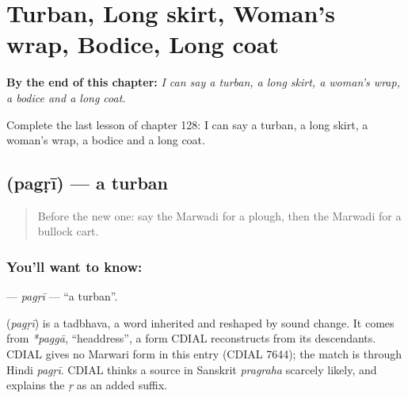 
\chapter{Turban, Long skirt, Woman's wrap, Bodice, Long coat}
\label{ch:mw-turban-long-skirt-woman-s-wrap-bodice-long-coat}

\begin{chapteropening}
\textbf{By the end of this chapter:} \emph{I can say a turban, a long skirt, a woman's wrap, a bodice and a long coat.}

Complete the last lesson of chapter 128: I can say a turban, a long skirt, a woman's wrap, a bodice and a long coat.
\end{chapteropening}

\section[\texorpdfstring{\mw{पगड़ी} (pagṛī)}{पगड़ी (pagṛī)}]{ (pagṛī) — a turban}

\label{lesson:MW-C128-pagri}



\begin{quote}
Before the new one: say the Marwadi for a plough, then the Marwadi for a bullock cart.
\end{quote}

\subsection*{You'll want to know: }
\textbf{} — \emph{pagṛī} — \textquotedblleft{}a turban\textquotedblright{}.

\begin{cousinweb}
\textbf{} (\emph{pagṛī}) is a tadbhava, a word inherited and reshaped by sound change. It comes from \emph{*paggā}, \textquotedblleft{}headdress\textquotedblright{}, a form CDIAL reconstructs from its descendants. CDIAL gives no Marwari form in this entry (CDIAL 7644); the match is through Hindi \emph{pagṛī}. CDIAL thinks a source in Sanskrit \emph{pragraha} scarcely likely, and explains the \emph{ṛ} as an added suffix.
\end{cousinweb}

